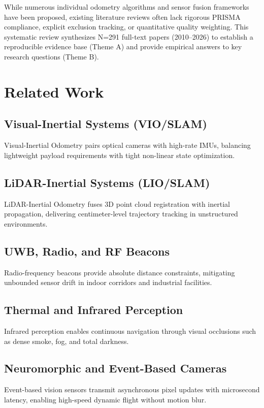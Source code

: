 \documentclass[journal,10pt,twocolumn]{IEEEtran}
\begin{document}
While numerous individual odometry algorithms and sensor fusion frameworks have been proposed, existing literature reviews often lack rigorous PRISMA compliance, explicit exclusion tracking, or quantitative quality weighting. This systematic review synthesizes N=291 full-text papers (2010--2026) to establish a reproducible evidence base (Theme A) and provide empirical answers to key research questions (Theme B).

\section{Related Work}
\subsection{Visual-Inertial Systems (VIO/SLAM)}
Visual-Inertial Odometry pairs optical cameras with high-rate IMUs, balancing lightweight payload requirements with tight non-linear state optimization.

\subsection{LiDAR-Inertial Systems (LIO/SLAM)}
LiDAR-Inertial Odometry fuses 3D point cloud registration with inertial propagation, delivering centimeter-level trajectory tracking in unstructured environments.

\subsection{UWB, Radio, and RF Beacons}
Radio-frequency beacons provide absolute distance constraints, mitigating unbounded sensor drift in indoor corridors and industrial facilities.

\subsection{Thermal and Infrared Perception}
Infrared perception enables continuous navigation through visual occlusions such as dense smoke, fog, and total darkness.

\subsection{Neuromorphic and Event-Based Cameras}
Event-based vision sensors transmit asynchronous pixel updates with microsecond latency, enabling high-speed dynamic flight without motion blur.
\end{document}

